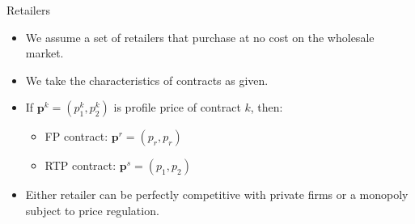 \documentclass{class}
\begin{document}
\begin{frame}{Retailers}

\begin{itemize}
    \item We assume a set of retailers that purchase at no cost on the wholesale market.

    \vfill

    \item We take the characteristics of contracts as given.  \vfill
    
    \item If $\textbf{p}^k=(p_1^k,p_2^k)$ is profile price of contract $k$, then:  \vfill

    \begin{itemize}
        \item FP contract: $\textbf{p}^{r} =  (p_r,p_r)$ \vfill
        \item RTP contract: $\textbf{p}^{s} =  (p_1,p_2)$
    \end{itemize}

\vfill

\item Either retailer can be perfectly competitive with private firms or a monopoly subject to price regulation.  

\end{itemize}


    
\end{frame}

    
\end{document}

